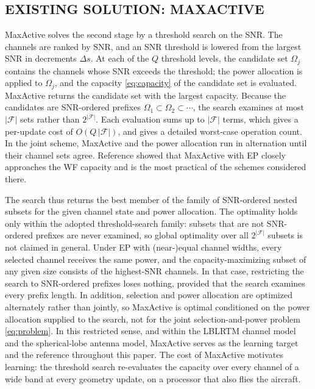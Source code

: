 \documentclass{ieee-ojvt}
\begin{document}
\subsection{EXISTING SOLUTION: MAXACTIVE}
\label{sec:maxactive}
MaxActive \cite{10399804} solves the second stage by a threshold search on the
SNR. The channels are ranked by SNR, and an SNR threshold is lowered from the largest SNR
in decrements $\Delta s$. At each of the $Q$ threshold levels, the candidate set
$\Omega_j$ contains the channels whose SNR exceeds the threshold; the power allocation is
applied to $\Omega_j$, and the capacity \eqref{eq:capacity} of the candidate set is
evaluated. MaxActive returns the candidate set with the largest capacity. Because the
candidates are SNR-ordered prefixes $\Omega_1\subset\Omega_2\subset\cdots$, the search
examines at most $|\mathcal{F}|$ sets rather than $2^{|\mathcal{F}|}$. Each evaluation
sums up to $|\mathcal{F}|$ terms, which gives a per-update cost of
$O(Q\,|\mathcal{F}|)$, and \cite{10399804} gives a detailed worst-case operation
count. In the joint scheme, MaxActive and the power allocation run in alternation until
their channel sets agree. Reference \cite{10399804} showed that MaxActive with
EP closely approaches the WF capacity and is the most practical of the schemes considered
there.

The search thus returns the best member of the family of SNR-ordered nested subsets for
the given channel state and power allocation. The optimality holds only within the
adopted threshold-search family: subsets that are not SNR-ordered prefixes are never
examined, so global optimality over all $2^{|\mathcal{F}|}$ subsets is not claimed in
general. Under EP with (near-)equal
channel widths, every selected channel receives the same power, and the
capacity-maximizing subset of any given size consists of the highest-SNR channels. In
that case, restricting the search to SNR-ordered prefixes loses nothing, provided that
the search examines every prefix length. In addition, selection and power allocation are
optimized alternately rather than jointly, so MaxActive is optimal conditioned on the
power allocation supplied to the search, not for the joint selection-and-power problem
\eqref{eq:problem}. In this restricted sense, and within the LBLRTM channel model and the
spherical-lobe antenna model, MaxActive serves as the learning target and the reference
throughout this paper. The cost of MaxActive motivates learning: the threshold search
re-evaluates the capacity over every channel of a wide band at every geometry update, on
a processor that also flies the aircraft.
\end{document}
